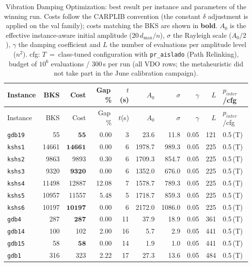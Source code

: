 \begingroup\scriptsize
\begin{longtable}{lrrrrrrrrl}
\caption{Vibration Damping Optimization: best result per instance and parameters of the winning run. Costs follow the CARPLIB convention (the constant $\delta$ adjustment is applied on the val family); costs matching the BKS are shown in \textbf{bold}. $A_0$ is the effective instance-aware initial amplitude ($20\,d_{\max}/n$), $\sigma$ the Rayleigh scale ($A_0/2$), $\gamma$ the damping coefficient and $L$ the number of evaluations per amplitude level ($n^2$). cfg: $T$~=~class-tuned configuration with \texttt{pr\_aislado} (Path Relinking), budget of $10^6$ evaluations / 300\,s per run (all VDO rows; the metaheuristic did not take part in the June calibration campaign).}\label{tab:vdo-per-instance}\\
\toprule
Instance & BKS & Cost & Gap\,\% & $t$(s) & $A_0$ & $\sigma$ & $\gamma$ & $L$ & $p_{inter}$/cfg \\
\midrule
\endfirsthead
\toprule
Instance & BKS & Cost & Gap\,\% & $t$(s) & $A_0$ & $\sigma$ & $\gamma$ & $L$ & $p_{inter}$/cfg \\
\midrule
\endhead
\bottomrule
\endfoot
\texttt{gdb19} & 55 & $\mathbf{55}$ & 0.00 & 3 & 23.6 & 11.8 & 0.05 & 121 & 0.5\,(T) \\
\texttt{kshs1} & 14661 & $\mathbf{14661}$ & 0.00 & 6 & 1978.7 & 989.3 & 0.05 & 225 & 0.5\,(T) \\
\texttt{kshs2} & 9863 & 9893 & 0.30 & 6 & 1709.3 & 854.7 & 0.05 & 225 & 0.5\,(T) \\
\texttt{kshs3} & 9320 & $\mathbf{9320}$ & 0.00 & 6 & 1352.0 & 676.0 & 0.05 & 225 & 0.5\,(T) \\
\texttt{kshs4} & 11498 & 12887 & 12.08 & 7 & 1578.7 & 789.3 & 0.05 & 225 & 0.5\,(T) \\
\texttt{kshs5} & 10957 & 11557 & 5.48 & 5 & 1718.7 & 859.3 & 0.05 & 225 & 0.5\,(T) \\
\texttt{kshs6} & 10197 & $\mathbf{10197}$ & 0.00 & 6 & 2172.0 & 1086.0 & 0.05 & 225 & 0.5\,(T) \\
\texttt{gdb4} & 287 & $\mathbf{287}$ & 0.00 & 11 & 37.9 & 18.9 & 0.05 & 361 & 0.5\,(T) \\
\texttt{gdb14} & 100 & 102 & 2.00 & 16 & 5.7 & 2.9 & 0.05 & 441 & 0.5\,(T) \\
\texttt{gdb15} & 58 & $\mathbf{58}$ & 0.00 & 14 & 1.9 & 1.0 & 0.05 & 441 & 0.5\,(T) \\
\texttt{gdb1} & 316 & 323 & 2.22 & 17 & 27.3 & 13.6 & 0.05 & 484 & 0.5\,(T) \\

\end{longtable}
